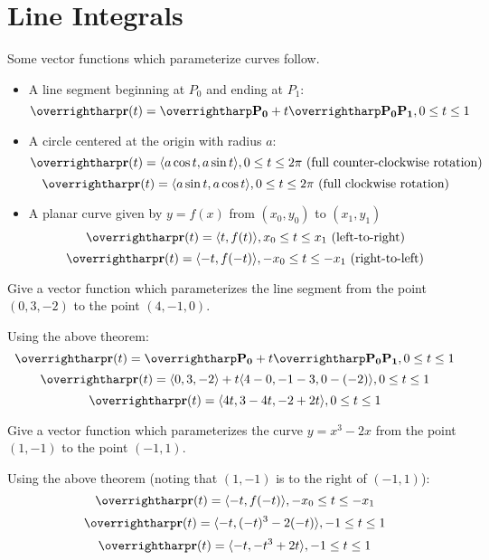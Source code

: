 \documentclass[letterpaper, twoside, 12pt]{book}
\begin{document}
\section{Line Integrals} %

\begin{theorem}
  Some vector functions which parameterize curves follow.
  \begin{itemize}
    \item
    A line segment beginning at $P_0$ and ending at $P_1$:
      \[
        \vect{r}(t) = \vect{P_0} + t\vect{P_0P_1}, 0\leq t\leq 1
      \]
    \item
    A circle centered at the origin with radius $a$:
      \[
        \vect{r}(t) = \<a\cos t,a\sin t\>, 0\leq t\leq 2\pi
        \text{ (full counter-clockwise rotation)}
      \]
      \[
        \vect{r}(t) = \<a\sin t,a\cos t\>, 0\leq t\leq 2\pi
        \text{ (full clockwise rotation)}
      \]
    \item
    A planar curve given by $y=f(x)$ from $(x_0,y_0)$ to $(x_1,y_1)$
      \[
        \vect{r}(t) = \<t,f(t)\>, x_0\leq t\leq x_1
        \text{ (left-to-right)}
      \]
      \[
        \vect{r}(t) = \<-t,f(-t)\>, -x_0\leq t\leq -x_1
        \text{ (right-to-left)}
      \]
    \end{itemize}
\end{theorem}

          \begin{problem}
            Give a vector function which parameterizes the line segment
            from the point $(0,3,-2)$ to the point $(4,-1,0)$.
          \end{problem}

          \begin{solution}
            Using the above theorem:
            \[
              \vect{r}(t) = \vect{P_0} + t\vect{P_0P_1}, 0\leq t\leq 1
            \]
            \[
              \vect{r}(t) = \<0,3,-2\> + t\<4-0,-1-3,0-(-2)\>, 0\leq t\leq 1
            \]
            \[
              \vect{r}(t) = \<4t,3-4t,-2+2t\>, 0\leq t\leq 1
            \]
          \end{solution}

          \begin{problem}
            Give a vector function which parameterizes the curve
            $y=x^3-2x$ from the point $(1,-1)$ to the point $(-1,1)$.
          \end{problem}

          \begin{solution}
            Using the above theorem (noting that \((1,-1)\) is to
            the right of \((-1,1)\)):
              \[
                \vect{r}(t) = \<-t,f(-t)\>, -x_0\leq t\leq -x_1
              \]
              \[
                \vect{r}(t) = \<-t,(-t)^3-2(-t)\>, -1\leq t\leq 1
              \]
              \[
                \vect{r}(t) = \<-t,-t^3+2t\>, -1\leq t\leq 1
              \]
          \end{solution}
\end{document}
